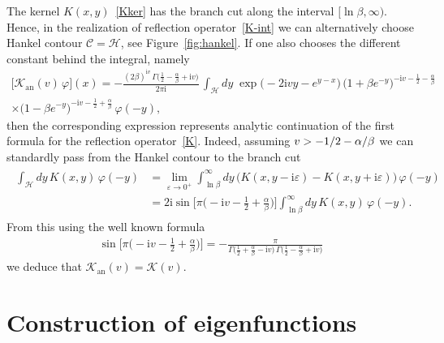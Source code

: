 \documentclass[11pt]{article}
\numberwithin{equation}{section}
\theoremstyle{plain}
\theoremstyle{definition}
\let\Im\relax
\DeclareMathOperator{\Im}{Im}
\renewcommand{\phi}{\varphi}
\renewcommand{\imath}{\mathrm{i}}
\renewcommand{\epsilon}{\varepsilon}
\begin{document}
The kernel $K(x,y)$~\eqref{Kker} has the branch cut along the interval $[\ln\beta, \infty)$. Hence, in the realization of reflection operator~\eqref{K-int} we can alternatively choose Hankel contour $\mathcal{C} = \mathcal{H}$, see Figure~\ref{fig:hankel}. If one also chooses the different constant behind the integral, namely
\begin{multline} 
	\bigl[ \mathcal{K}_{\mathrm{an}}(v) \, \phi \bigr] (x) = - \frac{(2\beta)^{\imath v} \, \Gamma \bigl( \frac{1}{2} - \frac{\alpha}{\beta} + \imath v\bigr)}{2\pi \imath} \,  \int_{\mathcal{H}} dy \; \exp \bigl(-2 \imath v y - e^{y -x} \bigr) \, \bigl(1 + \beta e^{-y}\bigr)^{- \imath v - \frac{1}{2} - \frac{\alpha}{\beta} } \\
	\times \bigl(1 - \beta e^{-y}\bigr)^{- \imath v - \frac{1}{2} + \frac{\alpha}{\beta}} \, \phi( - y),
\end{multline}
then the corresponding expression represents analytic continuation of the first formula for the reflection operator~\eqref{K}. Indeed, assuming $\Im v > -1/2 - \alpha/\beta$ we can standardly pass from the Hankel contour to the branch cut
\begin{align}
	\begin{aligned}
		\int_{\mathcal{H}} dy \, K(x,y) \, \phi(-y) & = \lim_{\epsilon \to 0^+} \int_{\ln \beta}^{\infty} dy \, \bigl( K(x, y - \imath \epsilon) - K(x, y + \imath \epsilon) \bigr) \, \phi(-y) \\[6pt]
		& = 2\imath \sin \biggl[ \pi \biggl( -\imath v - \frac{1}{2} + \frac{\alpha}{\beta} \biggr)\biggr] \int_{\ln \beta}^{\infty} dy \, K(x,y) \, \phi(-y).
	\end{aligned}
\end{align}
From this using the well known formula
\begin{align}
	\sin \biggl[ \pi \biggl( -\imath v - \frac{1}{2} + \frac{\alpha}{\beta} \biggr)\biggr] = - \frac{\pi}{\Gamma \bigl( \frac{1}{2} + \frac{\alpha}{\beta} - \imath v \bigr) \, \Gamma \bigl( \frac{1}{2} - \frac{\alpha}{\beta} + \imath v \bigr)}
\end{align}
we deduce that $\mathcal{K}_{\mathrm{an}}(v) = \mathcal{K}(v)$.


\section{Construction of eigenfunctions} \label{sec:constr-eigen}
\end{document}
